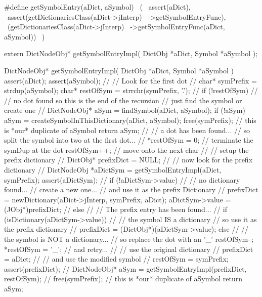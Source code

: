 #define getSymbolEntry(aDict, aSymbol)          \
  (                                             \
    assert(aDict),                              \
    assert(getDictionariesClass(aDict->jInterp) \
      ->getSymbolEntryFunc),                    \
    (getDictionariesClass(aDict->jInterp)       \
      ->getSymbolEntryFunc(aDict, aSymbol))     \
  )
\stopCHeader

\setCHeaderStream{private}
\startCHeader
extern DictNodeObj* getSymbolEntryImpl(
  DictObj *aDict,
  Symbol  *aSymbol
);
\stopCHeader
\setCHeaderStream{public}

\startCCode
DictNodeObj* getSymbolEntryImpl(
  DictObj *aDict,
  Symbol  *aSymbol
) {
  assert(aDict);
  assert(aSymbol);
  //
  // Look for the first dot
  //
  char* symPrefix = strdup(aSymbol);
  char* restOfSym = strrchr(symPrefix, '.');
  //
  if (!restOfSym) {
    //
    // no dot found so this is the end of the recursion
    // just find the symbol or create one
    //
    DictNodeObj* aSym = findSymbol(aDict, aSymbol);
    if (!aSym) {
      aSym = createSymbolInThisDictionary(aDict, aSymbol);
    }
    free(symPrefix); // this is *our* duplicate of aSymbol
    return aSym;
  }
  //
  // a dot has been found...
  // so split the symbol into two at the first dot...
  //
  *restOfSym = 0; // terminate the symDup at the dot
  restOfSym++;    // move onto the next char
  //
  // setup the prefix dictionary
  //
  DictObj* prefixDict = NULL;
  //
  // now look for the prefix dictionary
  //
  DictNodeObj *aDictSym =
    getSymbolEntryImpl(aDict, symPrefix);
  assert(aDictSym);
  //
  if (!aDictSym->value) {
    //
    // no dictionary found...
    // create a new one...
    // and use it as the prefix Dictionary
    //
    prefixDict = 
      newDictionary(aDict->jInterp, symPrefix, aDict);
    aDictSym->value = (JObj*)prefixDict;
    //
  } else {
    //
    // The prefix entry has been found...
    //
    if (isDictionary(aDictSym->value)) {
      //
      // the symbol IS a dictionary
      // so use it as the prefix dictionary
      //
      prefixDict = (DictObj*)(aDictSym->value);
    } else {
      //
      // the symbol is NOT a dictionary...
      // so replace the dot with an '_'
      restOfSym--;
      *restOfSym = '_';
      // and retry...
      //
      // use the original dictionary
      //
      prefixDict = aDict;
      //
      // and use the modified symbol
      //
      restOfSym = symPrefix;
    }
  }
  assert(prefixDict);
  //
  DictNodeObj* aSym =
    getSymbolEntryImpl(prefixDict, restOfSym);
  //
  free(symPrefix); // this is *our* duplicate of aSymbol
  return aSym;
}
\stopCCode
\stopTestSuite

